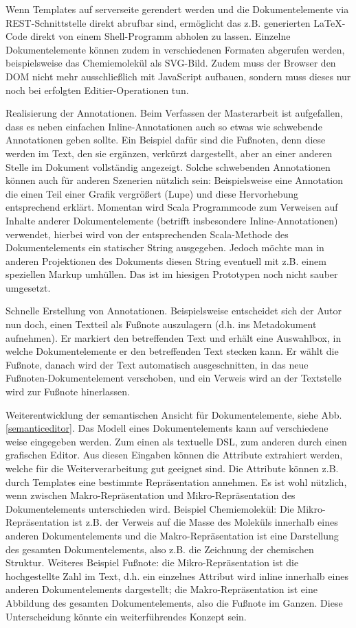  
Wenn Templates auf serverseite gerendert werden und die Dokumentelemente via REST-Schnittstelle direkt abrufbar sind, ermöglicht das z.B. generierten LaTeX-Code direkt von einem Shell-Programm abholen zu lassen. Einzelne Dokumentelemente können zudem in verschiedenen Formaten abgerufen werden, beispielsweise das Chemiemolekül als SVG-Bild. Zudem muss der Browser den DOM nicht mehr ausschließlich mit JavaScript aufbauen, sondern muss dieses nur noch bei erfolgten Editier-Operationen tun.

 
Realisierung der Annotationen. Beim Verfassen der Masterarbeit ist aufgefallen, dass es neben einfachen Inline-Annotationen auch so etwas wie schwebende Annotationen geben sollte. Ein Beispiel dafür sind die Fußnoten, denn diese werden im Text, den sie ergänzen, verkürzt dargestellt, aber an einer anderen Stelle im Dokument vollständig angezeigt. Solche schwebenden Annotationen können auch für anderen Szenerien nützlich sein: Beispielsweise eine Annotation die einen Teil einer Grafik vergrößert (Lupe) und diese Hervorhebung entsprechend erklärt. Momentan wird Scala Programmcode zum Verweisen auf Inhalte anderer Dokumentelemente (betrifft insbesondere Inline-Annotationen) verwendet, hierbei wird von der entsprechenden Scala-Methode des Dokumentelements ein statischer String ausgegeben. Jedoch möchte man in anderen Projektionen des Dokuments diesen String eventuell mit z.B. einem speziellen Markup umhüllen. Das ist im hiesigen Prototypen noch nicht sauber umgesetzt.

 
Schnelle Erstellung von Annotationen. Beispielsweise entscheidet sich der Autor nun doch, einen Textteil als Fußnote auszulagern (d.h. ins Metadokument aufnehmen). Er markiert den betreffenden Text und erhält eine Auswahlbox, in welche Dokumentelemente er den betreffenden Text stecken kann. Er wählt die Fußnote, danach wird der Text automatisch ausgeschnitten, in das neue Fußnoten-Dokumentelement verschoben, und ein Verweis wird an der Textstelle wird zur Fußnote hinerlassen.

 
Weiterentwicklung der semantischen Ansicht für Dokumentelemente, siehe Abb. \ref{semanticeditor}. Das Modell eines Dokumentelements kann auf verschiedene weise eingegeben werden. Zum einen als textuelle DSL, zum anderen durch einen grafischen Editor. Aus diesen Eingaben können die Attribute extrahiert werden, welche für die Weiterverarbeitung gut geeignet sind. Die Attribute können z.B. durch Templates eine bestimmte Repräsentation annehmen. Es ist wohl nützlich, wenn zwischen Makro-Repräsentation und Mikro-Repräsentation des Dokumentelements unterschieden wird. Beispiel Chemiemolekül: Die Mikro-Repräsentation ist z.B. der Verweis auf die Masse des Moleküls innerhalb eines anderen Dokumentelements und die Makro-Repräsentation ist eine Darstellung des gesamten Dokumentelements, also z.B. die Zeichnung der chemischen Struktur. Weiteres Beispiel Fußnote: die Mikro-Repräsentation ist die hochgestellte Zahl im Text, d.h. ein einzelnes Attribut wird inline innerhalb eines anderen Dokumentelements dargestellt; die Makro-Repräsentation ist eine Abbildung des gesamten Dokumentelements, also die Fußnote im Ganzen. Diese Unterscheidung könnte ein weiterführendes Konzept sein.

